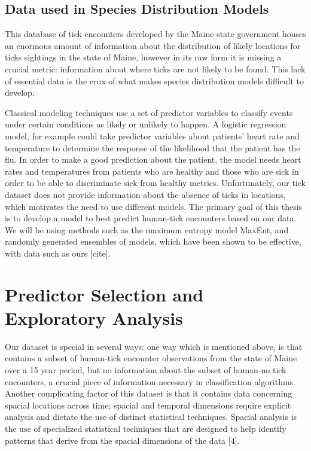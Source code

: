 \subsection{Data used in Species Distribution Models}

\noindent This database of tick encounters developed by the Maine state government houses an enormous amount of information about the distribution of likely locations for ticks sightings in the state of Maine, however in its raw form it is missing a crucial metric: information about where ticks are not likely to be found. This lack of essential data is the crux of what makes species distribution models difficult to develop. \newline

\noindent Classical modeling techniques use a set of predictor variables to classify events under certain conditions as likely or unlikely to happen. A logistic regression model, for example could take predictor variables about patients' heart rate and temperature to determine the response of the likelihood that the patient has the flu. In order to make a good prediction about the patient, the model needs heart rates and temperatures from patients who are healthy and those who are sick in order to be able to discriminate sick from healthy metrics. Unfortunately, our tick dataset does not provide information about the absence of ticks in locations, which motivates the need to use different models. The primary goal of this thesis is to develop a model to best predict human-tick encounters based on our data. We will be using methods such as the maximum entropy model MaxEnt, and randomly generated ensembles of models, which have been shown to be effective, with data such as ours [cite]. \newline





\section{Predictor Selection and Exploratory Analysis}
Our dataset is special in several ways: one way which is mentioned above, is that contains a subset of human-tick encounter observations from the state of Maine over a 15 year period, but no information about the subset of human-no tick encounters, a crucial piece of information necessary in classification algorithms. Another complicating factor of this dataset is that it contains data concerning spacial locations across time; spacial and temporal dimensions require explicit analysis and dictate the use of distinct statistical techniques. Spacial analysis is the use of specialized statistical techniques that are designed to help identify patterns that derive from the spacial dimensions of the data [4]. \newline

